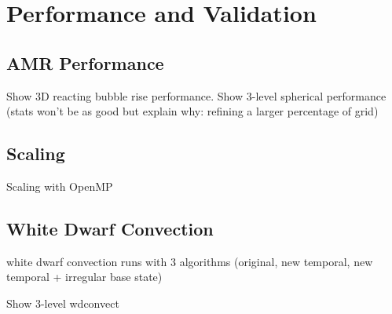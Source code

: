 \section{Performance and Validation}

\subsection{AMR Performance}
Show 3D reacting bubble rise performance.
Show 3-level spherical performance (stats won't be as good but explain why: refining a larger percentage of grid)

\subsection{Scaling}
Scaling with OpenMP

\subsection{White Dwarf Convection}
white dwarf convection runs with 3 algorithms (original, new temporal, new temporal + irregular base state)

Show 3-level wdconvect
